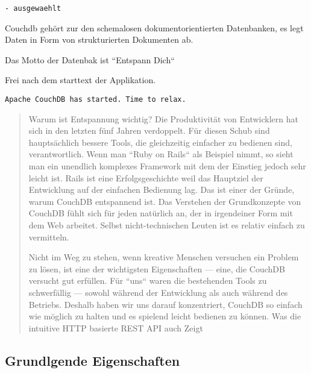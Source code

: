 \begin{verbatim}
- ausgewaehlt

\end{verbatim}

Couchdb gehört zur den schemalosen dokumentorientierten Datenbanken,
es legt Daten in Form von strukturierten Dokumenten ab.

Das Motto der Datenbak ist ``Entspann Dich``

Frei nach dem starttext der Applikation.

\begin{verbatim}
Apache CouchDB has started. Time to relax.
\end{verbatim}


\begin{quote}
Warum ist Entspannung wichtig? Die Produktivität von Entwicklern hat sich in den letzten fünf Jahren verdoppelt.
Für diesen Schub sind hauptsächlich bessere Tools, die gleichzeitig einfacher zu bedienen sind, verantwortlich.
Wenn man ``Ruby on Rails`` als Beispiel nimmt, so sieht man ein unendlich komplexes Framework mit dem der Einstieg jedoch sehr leicht ist.
Rails ist eine Erfolgsgeschichte weil das Hauptziel der Entwicklung auf der einfachen Bedienung lag.
Das ist einer der Gründe, warum CouchDB entspannend ist.
Das Verstehen der Grundkonzepte von CouchDB fühlt sich für jeden natürlich an, der in irgendeiner Form mit dem Web arbeitet.
Selbst nicht-technischen Leuten ist es relativ einfach zu vermitteln.

Nicht im Weg zu stehen, wenn kreative Menschen versuchen ein Problem zu lösen, ist eine der wichtigsten Eigenschaften — eine,
die CouchDB versucht gut erfüllen. Für ``uns`` waren die bestehenden Tools zu schwerfällig — sowohl während der Entwicklung
als auch während des Betriebs. Deshalb haben wir uns darauf konzentriert,
CouchDB so einfach wie möglich zu halten und es spielend leicht bedienen zu können.
Was die intuitive HTTP basierte REST API auch Zeigt
\end{quote}
\cite[Deutsche Einführung]{couchdb:guide}


\subsection{Grundlgende Eigenschaften}


